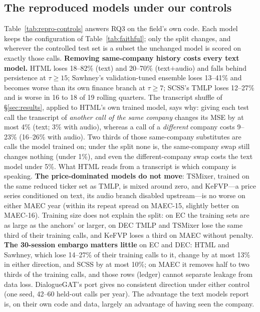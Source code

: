 \subsection{The reproduced models under our controls}
\label{sec:results-controls}
Table~\ref{tab:repro-controls} answers RQ3 on the field's own code. Each model keeps the
configuration of Table~\ref{tab:faithful}; only the split changes, and wherever the
controlled test set is a subset the unchanged model is scored on exactly those calls.
\textbf{Removing same-company history costs every text model.} HTML loses 18--82\%
(text) and 20--70\% (text$+$audio) and falls behind persistence at $\tau\ge 15$;
Sawhney's validation-tuned ensemble loses 13--41\% and becomes worse than its own
finance branch at $\tau\ge 7$; SCSS's TMLP loses 12--27\% and is worse in 16 to 18 of
19 rolling quarters. The transcript shuffle of \S\ref{sec:results}, applied to HTML's
own trained model, says why: giving each test call the transcript of \emph{another call
of the same company} changes its MSE by at most 4\% (text; 3\% with audio), whereas a
call of a \emph{different} company costs 9--23\% (16--26\% with audio). Two thirds of
those same-company substitutes are calls the model trained on; under the
\tickerdisjoint split none is, the same-company swap still changes nothing (under 1\%),
and even the different-company swap costs the text model under 5\%. What HTML reads
from a transcript is which company is speaking. \textbf{The price-dominated models do not move}: TSMixer, trained
on the same reduced ticker set as TMLP, is mixed around zero, and KeFVP---a price series
conditioned on text, its audio branch disabled upstream---is no worse on either MAEC
year (within its repeat spread on MAEC-15, slightly better on MAEC-16). Training size
does not explain the split: on EC the \tickerdisjoint training sets are as large as the
anchors' or larger, on DEC TMLP and TSMixer lose the same third of their training calls,
and KeFVP loses a third on MAEC without penalty. \textbf{The 30-session embargo matters
little} on EC and DEC: HTML and Sawhney, which lose 14--27\% of their training calls to
it, change by at most 13\% in either direction, and SCSS by at most 10\%; on MAEC it
removes half to two thirds of the training calls, and those rows (ledger) cannot
separate leakage from data loss. DialogueGAT's port gives no consistent direction under
either control (one seed, 42--60 held-out calls per year). The advantage the text models
report is, on their own code and data, largely an advantage of having seen the company.


